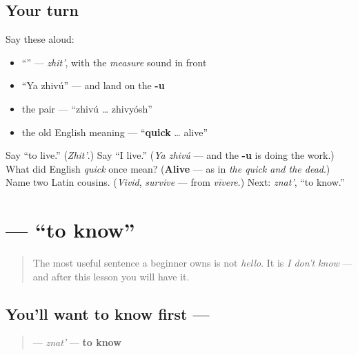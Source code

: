 \subsection*{Your turn}
Say these aloud:

\begin{itemize}
\raggedright
  \item \textquotedblleft{}\textquotedblright{} — \emph{zhit'}, with the \emph{measure} sound in front
  \item \textquotedblleft{}Ya zhivú\textquotedblright{} — and land on the \textbf{-u}
  \item the pair — \textquotedblleft{}zhivú … zhivyósh\textquotedblright{}
  \item the old English meaning — \textquotedblleft{}\textbf{quick} … alive\textquotedblright{}
\end{itemize}

\begin{tcolorbox}[breakable,colback=teal!4,colframe=teal!35!black,title={Before you move on}]
Say \textquotedblleft{}to live.\textquotedblright{} (\emph{Zhit'}.) Say \textquotedblleft{}I live.\textquotedblright{} (\emph{Ya zhivú} — and the \textbf{-u} is doing the work.) What did English \emph{quick} once mean? (\textbf{Alive} — as in \emph{the quick and the dead}.) Name two Latin cousins. (\emph{Vivid}, \emph{survive} — from \emph{vīvere}.) Next: \emph{znat'}, \textquotedblleft{}to know.\textquotedblright{}
\end{tcolorbox}
\section[\texorpdfstring{\ru{знать} (znat')}{знать (znat')}]{ — \textquotedblleft{}to know\textquotedblright{}}

\label{lesson:RU-C03-znat}



\begin{quote}
The most useful sentence a beginner owns is not \emph{hello}. It is \emph{I don't know} — and after this lesson you will have it.
\end{quote}

\subsection*{You'll want to know first — }
\begin{quote}
\textbf{} — \emph{znat'} — \textbf{to know}
\end{quote}

